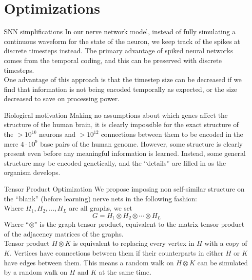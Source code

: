 \documentclass[leqno,presentation,unknownkeysallowed]{beamer}
\begin{document}
\section{Optimizations}

\begin{frame}{SNN simplifications}
In our nerve network model, instead of fully simulating a continuous waveform for the state of the neuron, we keep track of the spikes at discrete timesteps instead. The primary advantage of spiked neural networks comes from the temporal coding, and this can be preserved with discrete timesteps.\\
One advantage of this approach is that the timestep size can be decreased if we find that information is not being encoded temporally as expected, or the size decreased to save on processing power.
\end{frame}

\begin{frame}{Biological motivation}
Making no assumptions about which genes affect the structure of the human brain, it is clearly impossible for the exact structure of the $>10^{10}$ neurons and $>10^{12}$ connections between them to be encoded in the mere $4 \cdot 10^{9}$ base pairs of the human genome. However, some structure is clearly present even before any meaningful information is learned. Instead, some general structure may be encoded genetically, and the ``details'' are filled in as the organism develops.
\end{frame}

\begin{frame}{Tensor Product Optimization}
We propose imposing non self-similar structure on the ``blank'' (before learning) nerve nets in the following fashion:\\
Where $H_1, H_2, \ldots, H_L$ are all graphs, we set  
$$ G = H_1 \otimes H_2 \otimes \cdots \otimes H_L $$
Where ``$\otimes$'' is the graph tensor product, equivalent to the matrix tensor product of the adjacency matrices of the graphs.\\
Tensor product $H \otimes K$ is equivalent to replacing every vertex in $H$ with a copy of $K$. Vertices have connections between them if their counterparts in either $H$ or $K$ have edges between them. This means a random walk on $H \otimes K$ can be simulated by a random walk on $H$ and $K$ at the same time.
\end{frame}
\end{document}
